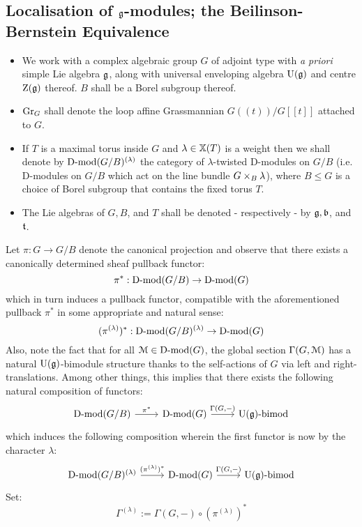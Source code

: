     \subsection{Localisation of \texorpdfstring{$\mathfrak{g}$}{}-modules; the Beilinson-Bernstein Equivalence}
        \begin{convention} \label{conv: beilinson_bernstein_localisation_conventions}
            \noindent
            \begin{itemize}
                \item We work with a complex algebraic group $G$ of adjoint type with \textit{a priori} simple Lie algebra $\mathfrak{g}$, along with universal enveloping algebra $\mathrm{U}(\mathfrak{g})$ and centre $\mathrm{Z}(\mathfrak{g})$ thereof. $B$ shall be a Borel subgroup thereof. 
                \item $\mathrm{Gr}_G$ shall denote the loop affine Grassmannian $G(\!(t)\!)/G[\![t]\!]$ attached to $G$.
                \item If $T$ is a maximal torus inside $G$ and $\lambda \in \mathbb{X}(T)$ is a weight then we shall denote by $\mathrm{D}\text{-}\mathrm{mod}(G/B)^{(\lambda)}$ the category of $\lambda$-twisted D-modules on $G/B$ (i.e. D-modules on $G/B$ which act on the line bundle $G \x_B \lambda$), where $B \leq G$ is a choice of Borel subgroup that contains the fixed torus $T$.
                \item The Lie algebras of $G, B$, and $T$ shall be denoted - respectively - by $\mathfrak{g}, \mathfrak{b}$, and $\mathfrak{t}$.
            \end{itemize}
        \end{convention}
        
        Let $\pi: G \to G/B$ denote the canonical projection and observe that there exists a canonically determined sheaf pullback functor:
            $$\pi^*: \mathrm{D}\text{-}\mathrm{mod}(G/B) \to \mathrm{D}\text{-}\mathrm{mod}(G)$$
        which in turn induces a  pullback functor, compatible with the aforementioned pullback $\pi^*$ in some appropriate and natural sense:
            $$(\pi^{(\lambda)})^*: \mathrm{D}\text{-}\mathrm{mod}(G/B)^{(\lambda)} \to \mathrm{D}\text{-}\mathrm{mod}(G)$$
        Also, note the fact that for all $\mathcal{M} \in \mathrm{D}\text{-}\mathrm{mod}(G)$, the global section $\Gamma(G, \mathcal{M})$ has a natural $\mathrm{U}(\mathfrak{g})$-bimodule structure thanks to the self-actions of $G$ via left and right-translations. Among other things, this implies that there exists the following natural composition of functors:
            $$
                \begin{tikzcd}
                	{\Dmod(G/B}) & {\Dmod(G)} & {\U(\g)\bimod}
                	\arrow["{\pi^*}", from=1-1, to=1-2]
                	\arrow["{\Gamma(G, -)}", from=1-2, to=1-3]
                \end{tikzcd}
            $$
        which induces the following composition wherein the first functor is now  by the character $\lambda$:
            $$
                \begin{tikzcd}
                	{\Dmod(G/B)^{(\lambda)}} & {\Dmod(G)} & {\U(\g)\bimod}
                	\arrow["{(\pi^{(\lambda)})^*}", from=1-1, to=1-2]
                	\arrow["{\Gamma(G, -)}", from=1-2, to=1-3]
                \end{tikzcd}
            $$
        Set:
            $$\Gamma^{(\lambda)} := \Gamma(G, -) \circ (\pi^{(\lambda)})^*$$
        
